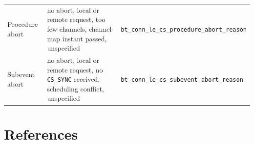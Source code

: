 \documentclass[11pt,a4paper]{article}
\newcommand{\code}[1]{\texttt{\small #1}}
\begin{document}
\begin{table}[h]
\begin{tabular}{@{}L{34mm}L{40mm}L{56mm}@{}}
Procedure abort & no abort, local or remote request, too few channels, channel-map instant passed, unspecified & \code{bt\_\allowbreak{}conn\_\allowbreak{}le\_\allowbreak{}cs\_\allowbreak{}procedure\_\allowbreak{}abort\_\allowbreak{}reason} \\
Subevent abort & no abort, local or remote request, no \code{CS\_\allowbreak{}SYNC} received, scheduling conflict, unspecified & \code{bt\_\allowbreak{}conn\_\allowbreak{}le\_\allowbreak{}cs\_\allowbreak{}subevent\_\allowbreak{}abort\_\allowbreak{}reason} \\
\bottomrule
\end{tabular}
\end{table}

\section*{References}
\end{document}
